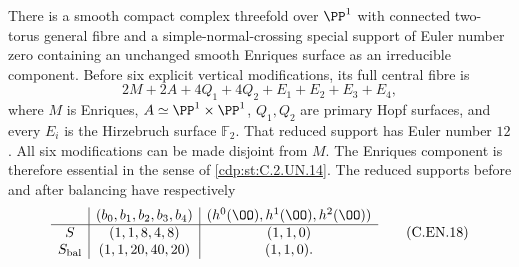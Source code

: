 
\begin{proposition}\label{cdp:st:C.2.UN.25}
There is a smooth compact complex threefold over
$\PP^1$ with connected two-torus general fibre and
a simple-normal-crossing special support of Euler
number zero containing an unchanged smooth Enriques
surface as an irreducible component.
Before six explicit vertical modifications, its full
central fibre is
\[
 2M+2A+4Q_1+4Q_2+E_1+E_2+E_3+E_4,                 \tag{C.EN.1}\label{cdp:eq:C.EN.1}
\]
where $M$ is Enriques, $A\simeq\PP^1\times\PP^1$,
$Q_1,Q_2$ are primary Hopf surfaces, and every
$E_i$ is the Hirzebruch surface $\mathbb F_2$.
That reduced support has Euler number $12$.
All six modifications can be made disjoint from $M$.
The Enriques component is therefore essential in the
sense of \ref{cdp:st:C.2.UN.14}.
The reduced supports before and after balancing have
respectively
\[
 \begin{array}{c|c|c}
 & (b_0,b_1,b_2,b_3,b_4)&(h^0(\OO),h^1(\OO),h^2(\OO))\\ \hline
 S&(1,1,8,4,8)&(1,1,0)\\
 S_{\rm bal}&(1,1,20,40,20)&(1,1,0).
 \end{array}                                             \tag{C.EN.18}\label{cdp:eq:C.EN.18}
\]
\end{proposition}

